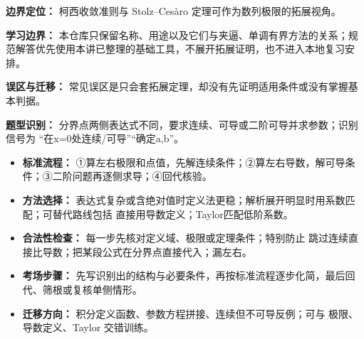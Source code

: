 \begin{knowledgeBox}
\textbf{边界定位：} 柯西收敛准则与 Stolz--Ces\`aro 定理可作为数列极限的拓展视角。

\textbf{学习边界：} 本仓库只保留名称、用途以及它们与夹逼、单调有界方法的关系；规范解答优先使用本讲已整理的基础工具，不展开拓展证明，也不进入本地复习安排。

\textbf{误区与迁移：} 常见误区是只会套拓展定理，却没有先证明适用条件或没有掌握基本判据。
\end{knowledgeBox}

\begin{knowledgeBox}
\textbf{题型识别：} 分界点两侧表达式不同，要求连续、可导或二阶可导并求参数；识别信号为 “在x=0处连续/可导”“确定a,b”。

\begin{itemize}
  \item \textbf{标准流程：} ①算左右极限和点值，先解连续条件；②算左右导数，解可导条件；③二阶问题再逐侧求导；④回代核验。
  \item \textbf{方法选择：} 表达式复杂或含绝对值时定义法更稳；解析展开明显时用系数匹配；可替代路线包括 直接用导数定义；Taylor匹配低阶系数。
  \item \textbf{合法性检查：} 每一步先核对定义域、极限或定理条件；特别防止 跳过连续直接比导数；把某段公式在分界点直接代入；漏左右。
  \item \textbf{考场步骤：} 先写识别出的结构与必要条件，再按标准流程逐步化简，最后回代、筛根或复核单侧情形。
  \item \textbf{迁移方向：} 积分定义函数、参数方程拼接、连续但不可导反例；可与 极限、导数定义、Taylor 交错训练。
\end{itemize}
\end{knowledgeBox}
